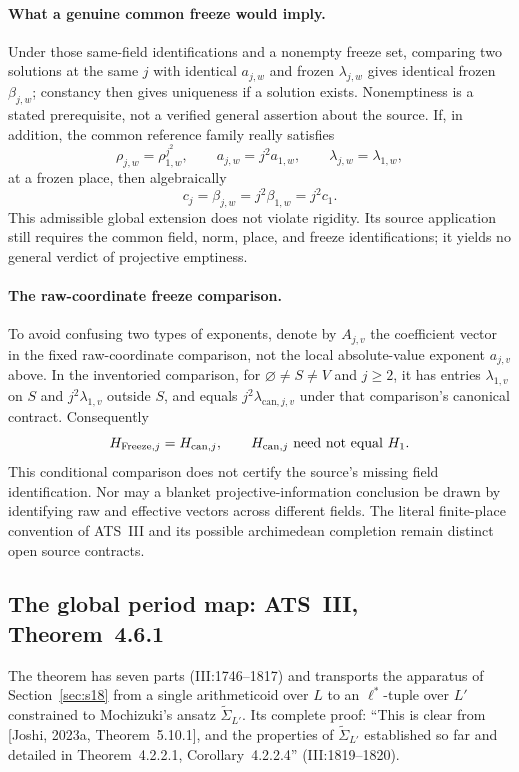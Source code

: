 \documentclass[11pt,a4paper]{article}
\theoremstyle{definition}
\theoremstyle{remark}
\begin{document}
\paragraph{What a genuine common freeze would imply.}
Under those same-field identifications and a nonempty freeze set, comparing
two solutions at the same $j$ with identical $a_{j,w}$ and frozen
$\lambda_{j,w}$ gives identical frozen $\beta_{j,w}$; constancy then gives
uniqueness if a solution exists. Nonemptiness is a stated prerequisite,
not a verified general assertion about the source. If, in addition, the
common reference family really satisfies
\[
 \rho_{j,w}=\rho_{1,w}^{j^2},\qquad
 a_{j,w}=j^2 a_{1,w},\qquad \lambda_{j,w}=\lambda_{1,w},
\]
at a frozen place, then algebraically
\[
 c_j=\beta_{j,w}=j^2\beta_{1,w}=j^2c_1.
\]
This admissible global extension does not violate rigidity. Its source
application still requires the common field, norm, place, and freeze
identifications; it yields no general verdict of projective emptiness.

\paragraph{The raw-coordinate freeze comparison.}
To avoid confusing two types of exponents, denote by $A_{j,v}$ the
coefficient vector in the fixed raw-coordinate comparison, not the local
absolute-value exponent $a_{j,v}$ above. In the inventoried comparison,
for $\varnothing\ne S\ne V$ and $j\ge2$, it has entries $\lambda_{1,v}$
on $S$ and $j^2\lambda_{1,v}$ outside $S$, and equals
$j^2\lambda_{\mathrm{can},j,v}$ under that comparison's canonical contract.
Consequently
\[
 H_{\mathrm{Freeze},j}=H_{\mathrm{can},j},
 \qquad H_{\mathrm{can},j}\ \hbox{need not equal}\ H_1.
\]
This conditional comparison does not certify the source's missing field
identification. Nor may a blanket projective-information conclusion be
drawn by identifying raw and effective vectors across different fields.
The literal finite-place convention of ATS~III and its possible
archimedean completion remain distinct open source contracts.

\subsection{The global period map: ATS~III, Theorem~4.6.1}\label{sec:s17}

The theorem has seven parts (III:1746--1817) and transports the apparatus of
Section~\ref{sec:s18} from a single arithmeticoid over $L$ to an $\ell^*$-tuple
over $L'$ constrained to Mochizuki's ansatz $\widetilde{\Sigma}_{L'}$. Its
complete proof: ``This is clear from [Joshi, 2023a, Theorem~5.10.1], and the
properties of $\widetilde{\Sigma}_{L'}$ established so far and detailed in
Theorem~4.2.2.1, Corollary~4.2.2.4'' (III:1819--1820).
\end{document}
